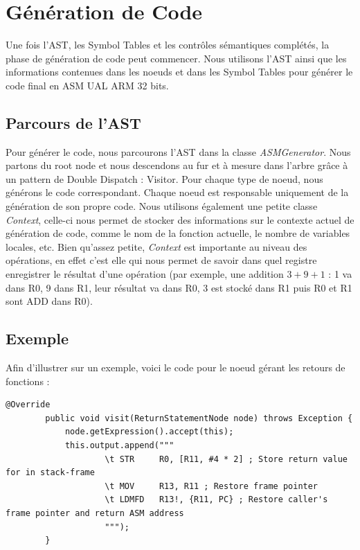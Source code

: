 \documentclass[french,a4paper]{article}
\begin{document}
    \section{Génération de Code}
    Une fois l'AST, les Symbol Tables et les contrôles sémantiques complétés, la phase de génération de code peut commencer. Nous utilisons l'AST ainsi que les informations contenues dans les noeuds et dans les Symbol Tables pour générer le code final en ASM UAL ARM 32 bits.

    \subsection{Parcours de l'AST}
    Pour générer le code, nous parcourons l'AST dans la classe \textit{ASMGenerator}. Nous partons du root node et nous descendons au fur et à mesure dans l'arbre grâce à un pattern de Double Dispatch : Visitor. Pour chaque type de noeud, nous générons le code correspondant. Chaque noeud est responsable uniquement de la génération de son propre code. Nous utilisons également une petite classe \textit{Context}, celle-ci nous permet de stocker des informations sur le contexte actuel de génération de code, comme le nom de la fonction actuelle, le nombre de variables locales, etc. Bien qu'assez petite, \textit{Context} est importante au niveau des opérations, en effet c'est elle qui nous permet de savoir dans quel registre enregistrer le résultat d'une opération (par exemple, une addition $3+9+1$ : 1 va dans R0, 9 dans R1, leur résultat va dans R0, 3 est stocké dans R1 puis R0 et R1 sont ADD dans R0). \\

    \subsection{Exemple}
    Afin d'illustrer sur un exemple, voici le code pour le noeud gérant les retours de fonctions :
    \begin{lstlisting}[label={lst:lstlisting18}]
        @Override
        public void visit(ReturnStatementNode node) throws Exception {
            node.getExpression().accept(this);
            this.output.append("""
                    \t STR     R0, [R11, #4 * 2] ; Store return value for in stack-frame
                    \t MOV     R13, R11 ; Restore frame pointer
                    \t LDMFD   R13!, {R11, PC} ; Restore caller's frame pointer and return ASM address
                    """);
        }
    \end{lstlisting}
\end{document}
